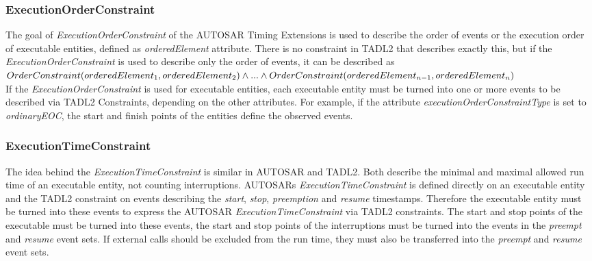 	\subsubsection{ExecutionOrderConstraint}
		The goal of \emph{ExecutionOrderConstraint} of the AUTOSAR Timing Extensions is used to describe the order of events or the execution order of executable entities, defined as \emph{orderedElement} attribute. There is no constraint in TADL2 that describes exactly this, but if the \emph{ExecutionOrderConstraint} is used to describe only the order of events, it can be described as \\[10pt]
		\begin{math}
			OrderConstraint(orderedElement_1, orderedElement_2)\\
			\land ... \land\\
			OrderConstraint(orderedElement_{n-1}, orderedElement_n)
		\end{math}\\[10pt]
		If the \emph{ExecutionOrderConstraint} is used for executable entities, each executable entity must be turned into one or more events to be described via TADL2 Constraints, depending on the other attributes. For example, if the attribute \emph{executionOrderConstraintType} is set to \emph{ordinaryEOC}, the start and finish points of the entities define the observed events.
		
	\subsubsection{ExecutionTimeConstraint}
		The idea behind the \emph{ExecutionTimeConstraint} is similar in AUTOSAR and TADL2. Both describe the minimal and maximal allowed run time of an executable entity, not counting interruptions. AUTOSARs \emph{ExecutionTimeConstraint} is defined directly on an executable entity and the TADL2 constraint on events describing the \emph{start}, \emph{stop}, \emph{preemption} and \emph{resume} timestamps. Therefore the executable entity must be turned into these events to express the AUTOSAR \emph{ExecutionTimeConstraint} via TADL2 constraints. The start and stop points of the executable must be turned into these events, the start and stop points of the interruptions must be turned into the events in the \emph{preempt} and \emph{resume} event sets. If external calls should be excluded from the run time, they must also be transferred into the \emph{preempt} and \emph{resume} event sets.
